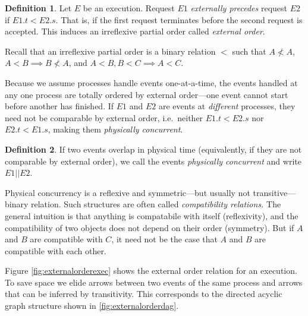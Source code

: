 \documentclass[]             %
{NASA}                       %
\theoremstyle{definition}
\newtheorem{definition}{Definition}[section]
\begin{document}
\begin{definition}
Let $E$ be an execution. Request $E1$ \emph{externally precedes}
request $E2$ if $E1.t < E2.s$. That is, if the first request
terminates before the second request is accepted. This induces an
irreflexive partial order called \emph{external order}.
\end{definition}

Recall that an irreflexive partial order is a binary relation \(<\) such
that \(A \not < A\), \(A < B \implies B \not < A\), and
\(A < B, B < C \implies A < C\).

Because we assume processes handle events one-at-a-time, the events
handled at any one process are totally ordered by external order---one
event cannot start before another has finished. If \(E1\) and \(E2\) are
events at \emph{different} processes, they need not be comparable by
external order, i.e.~neither \(E1.t < E2.s\) nor \(E2.t < E1.s\), making
them \emph{physically concurrent}.

\begin{definition}
If two events overlap in physical time
(equivalently, if they are not comparable by external order), we call the events \emph{physically concurrent} and
write $E1 || E2$.
\end{definition}

Physical concurrency is a reflexive and symmetric---but usually not
transitive--- binary relation. Such structures are often called
\emph{compatibility relations.} The general intuition is that anything
is compatabile with itself (reflexivity), and the compatibility of two
objects does not depend on their order (symmetry). But if \(A\) and
\(B\) are compatible with \(C\), it need not be the case that \(A\) and
\(B\) are compatible with each other.

Figure \ref{fig:externalorderexec} shows the external order relation for
an execution. To save space we elide arrows between two events of the
same process and arrows that can be inferred by transitivity. This
corresponds to the directed acyclic graph structure shown in
\ref{fig:externalorderdag}.
\end{document}
